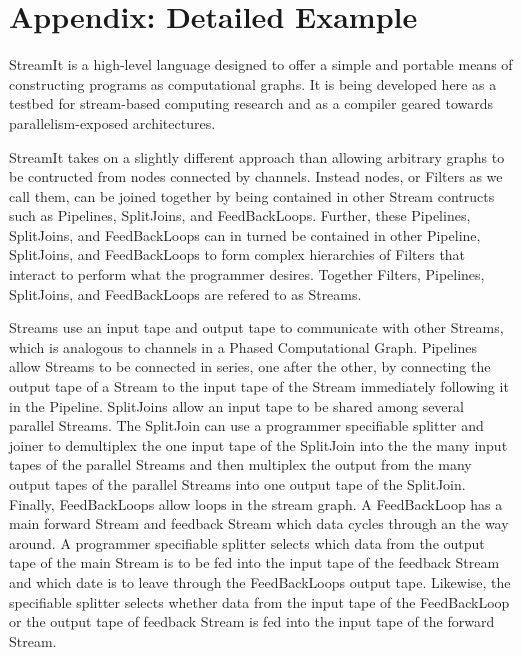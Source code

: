 \section{Appendix: Detailed Example}
StreamIt is a high-level language designed to offer a simple and portable means of constructing programs as computational graphs. It is being developed here as a testbed for stream-based computing research and as a compiler geared towards parallelism-exposed architectures.

StreamIt takes on a slightly different approach than allowing arbitrary graphs to be contructed from nodes connected by channels. Instead nodes, or Filters as we call them, can be joined together by being contained in other Stream contructs such as Pipelines, SplitJoins, and FeedBackLoops. Further, these Pipelines, SplitJoins, and FeedBackLoops can in turned be contained in other Pipeline, SplitJoins, and FeedBackLoops to form complex hierarchies of Filters that interact to perform what the programmer desires. Together Filters, Pipelines, SplitJoins, and FeedBackLoops are refered to as Streams.

Streams use an input tape and output tape to communicate with other Streams, which is analogous to channels in a Phased Computational Graph. Pipelines allow Streams to be connected in series, one after the other, by connecting the output tape of a Stream to the input tape of the Stream immediately following it in the Pipeline. SplitJoins allow an input tape to be shared among several parallel Streams. The SplitJoin can use a programmer specifiable splitter and joiner to demultiplex the one input tape of the SplitJoin into the the many input tapes of the parallel Streams and then multiplex the output from the many output tapes of the parallel Streams into one output tape of the SplitJoin. Finally, FeedBackLoops allow loops in the stream graph. A FeedBackLoop has a main forward Stream and feedback Stream which data cycles through an the way around. A programmer specifiable splitter selects which data from the output tape of the main Stream is to be fed into the input tape of the feedback Stream and which date is to leave through the FeedBackLoops output tape. Likewise, the specifiable splitter selects whether data from the input tape of the FeedBackLoop or the output tape of feedback Stream is fed into the input tape of the forward Stream.

